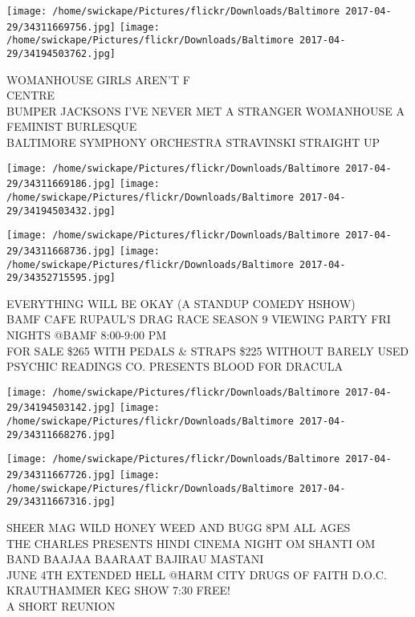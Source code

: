 \documentclass[10pt,letterpaper]{article}
\begin{document}
\texttt{[image: /home/swickape/Pictures/flickr/Downloads/Baltimore 2017-04-29/34311669756.jpg]}
\texttt{[image: /home/swickape/Pictures/flickr/Downloads/Baltimore 2017-04-29/34194503762.jpg]}

WOMANHOUSE GIRLS AREN'T F\\
CENTRE\\
BUMPER JACKSONS I'VE NEVER MET A STRANGER WOMANHOUSE A FEMINIST BURLESQUE\\
BALTIMORE SYMPHONY ORCHESTRA STRAVINSKI STRAIGHT UP\\
\pagebreak

\texttt{[image: /home/swickape/Pictures/flickr/Downloads/Baltimore 2017-04-29/34311669186.jpg]}
\texttt{[image: /home/swickape/Pictures/flickr/Downloads/Baltimore 2017-04-29/34194503432.jpg]}

\texttt{[image: /home/swickape/Pictures/flickr/Downloads/Baltimore 2017-04-29/34311668736.jpg]}
\texttt{[image: /home/swickape/Pictures/flickr/Downloads/Baltimore 2017-04-29/34352715595.jpg]}

EVERYTHING WILL BE OKAY (A STANDUP COMEDY HSHOW)\\
BAMF CAFE RUPAUL'S DRAG RACE SEASON 9 VIEWING PARTY FRI NIGHTS @BAMF 8:00{-}9:00 PM\\
FOR SALE \$265 WITH PEDALS \& STRAPS \$225 WITHOUT BARELY USED\\
PSYCHIC READINGS CO. PRESENTS BLOOD FOR DRACULA\\
\pagebreak

\texttt{[image: /home/swickape/Pictures/flickr/Downloads/Baltimore 2017-04-29/34194503142.jpg]}
\texttt{[image: /home/swickape/Pictures/flickr/Downloads/Baltimore 2017-04-29/34311668276.jpg]}

\texttt{[image: /home/swickape/Pictures/flickr/Downloads/Baltimore 2017-04-29/34311667726.jpg]}
\texttt{[image: /home/swickape/Pictures/flickr/Downloads/Baltimore 2017-04-29/34311667316.jpg]}

SHEER MAG WILD HONEY WEED AND BUGG 8PM ALL AGES\\
THE CHARLES PRESENTS HINDI CINEMA NIGHT OM SHANTI OM BAND BAAJAA BAARAAT BAJIRAU MASTANI\\
JUNE 4TH EXTENDED HELL @HARM CITY DRUGS OF FAITH D.O.C. KRAUTHAMMER KEG SHOW 7:30 FREE!\\
A SHORT REUNION\\
\pagebreak
\end{document}
